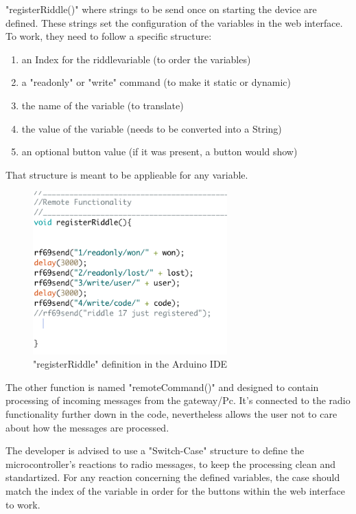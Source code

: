 "registerRiddle()" where strings to be send once on starting the device are defined. 
These strings set the configuration of the variables in the web interface.
To work, they need to follow a specific structure:
\begin{enumerate}
    \item an Index for the riddlevariable (to order the variables)
    \item a "readonly" or "write" command (to make it static or dynamic)
    \item the name of the variable (to translate)
    \item the value of the variable (needs to be converted into a String)
    \item an optional button value (if it was present, a button would show)
\end{enumerate}
That structure is meant to be applieable for any variable. 

\begin{figure}[th]
	\centering
	\includegraphics[width=75mm,scale=0.75]{Figures/registerRiddle}
	\decoRule
	\caption[FrontViewTable]{"registerRiddle" definition in the Arduino IDE}
	\label{fig:FrontViewTable}
\end{figure}


The other function is named "remoteCommand()" and designed to contain processing of incoming messages from the gateway/Pc.
It's connected to the radio functionality further down in the code, nevertheless allows the user not to care about how the messages are processed.

The developer is advised to use a "Switch-Case" structure to define the microcontroller's reactions to radio messages, to keep the processing clean and standartized. 
For any reaction concerning the defined variables, the case should match the index of the variable in order for the buttons within the web interface to work.

